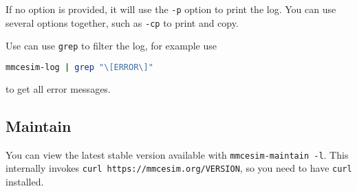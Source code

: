 If no option is provided, it will use the \texttt{-p} option to print the log.
You can use several options together, such as \texttt{-cp} to print and copy.

\begin{tip}
  Use can use \texttt{grep} to filter the log, for example use
  \begin{lstlisting}[language=sh]
mmcesim-log | grep "\[ERROR\]"
  \end{lstlisting}
  to get all error messages.
\end{tip}

\subsection{Maintain}
You can view the latest stable version available with
\texttt{mmcesim-maintain~-l}.
This internally invokes \texttt{curl https://mmcesim.org/VERSION},
so you need to have \texttt{curl} installed.

